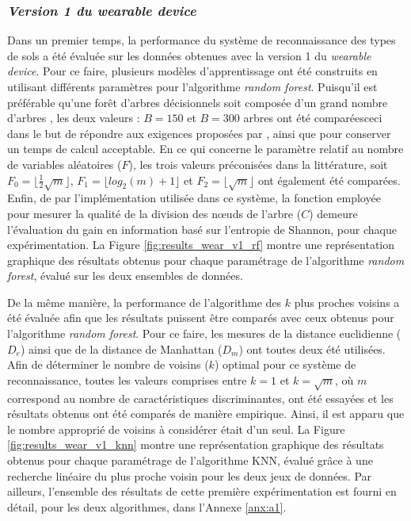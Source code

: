 \subsubsection{\textit{Version 1 du wearable device}}

Dans un premier temps, la performance du système de reconnaissance des types de sols a été évaluée sur les données obtenues avec la version 1 du \textit{wearable device}. Pour ce faire, plusieurs modèles d'apprentissage ont été construits en utilisant différents paramètres pour l'algorithme \textit{random forest}. Puisqu'il est préférable qu'une forêt d'arbres décisionnels soit composée d'un grand nombre d'arbres \citep{Breiman2001}, les deux valeurs : $B=150$ et $B=300$ arbres ont été comparées\textemdash ceci dans le but de répondre aux exigences proposées par \cite{Breiman2001}, ainsi que pour conserver un temps de calcul acceptable. En ce qui concerne le paramètre relatif au nombre de variables aléatoires ($F$), les trois valeurs préconisées dans la littérature, soit $F_0=\lfloor \frac{1}{2}\sqrt{m}\rfloor$, $F_1=\lfloor log_2(m) + 1\rfloor$ et $F_2=\lfloor \sqrt{m}\rfloor$ ont également été comparées. Enfin, de par l'implémentation utilisée dans ce système, la fonction employée pour mesurer la qualité de la division des n\oe{}uds de l'arbre ($C$) demeure l'évaluation du gain en information basé sur l'entropie de Shannon, pour chaque expérimentation. La Figure \ref{fig:results_wear_v1_rf} montre une représentation graphique des résultats obtenus pour chaque paramétrage de l'algorithme \textit{random forest}, évalué sur les deux ensembles de données.

De la même manière, la performance de l'algorithme des $k$ plus proches voisins a été évaluée afin que les résultats puissent être comparés avec ceux obtenus pour l'algorithme \textit{random forest}. Pour ce faire, les mesures de la distance euclidienne ($D_e$) ainsi que de la distance de Manhattan ($D_m$) ont toutes deux été utilisées. Afin de déterminer le nombre de voisins ($k$) optimal pour ce système de reconnaissance, toutes les valeurs comprises entre $k=1$ et $k=\sqrt{m}$, où $m$ correspond au nombre de caractéristiques discriminantes, ont été essayées et les résultats obtenus ont été comparés de manière empirique. Ainsi, il est apparu que le nombre approprié de voisins à considérer était d'un seul. La Figure \ref{fig:results_wear_v1_knn} montre une représentation graphique des résultats obtenus pour chaque paramétrage de l'algorithme \acs{KNN}, évalué grâce à une recherche linéaire du plus proche voisin pour les deux jeux de données. Par ailleurs, l'ensemble des résultats de cette première expérimentation est fourni en détail, pour les deux algorithmes, dans l'Annexe \ref{anx:a1}.

